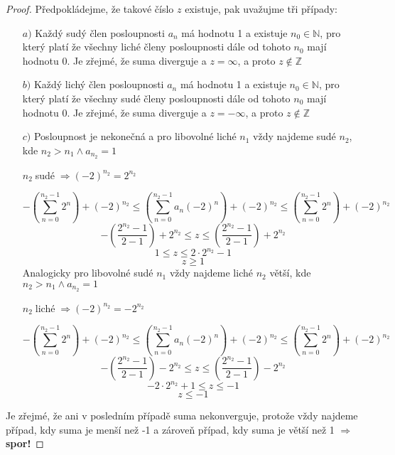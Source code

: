 \documentclass[czech,bachelor,dept470,male]{diploma}
\begin{document}
\begin{proof}
	Předpokládejme, že takové číslo $z$ existuje, pak uvažujme tři případy:
	\begin{itemize}
		\item[$a)$]
		Každý sudý člen posloupnosti $a_n$ má hodnotu 1 a existuje $n_0\in\mathbb{N}$, pro který platí že všechny liché členy posloupnosti dále od tohoto $n_0$ mají hodnotu 0.
		Je zřejmé, že suma diverguje a $z=\infty$, a proto $z \notin \mathbb{Z}$
		\item[$b)$]Každý lichý člen posloupnosti $a_n$ má hodnotu 1 a existuje $n_0\in\mathbb{N}$, pro který platí že všechny sudé členy posloupnosti dále od tohoto $n_0$ mají hodnotu 0.
		Je zřejmé, že suma diverguje a $z=-\infty$, a proto $z \notin \mathbb{Z}$
		\item[$c)$] Posloupnost je nekonečná a pro libovolné liché $n_1$ vždy najdeme sudé $n_2$, kde $ n_2>n_1 \land a_{n_2}=1$
		\begin{center}$ n_2 \; $sudé$ \; \Rightarrow (-2)^{n_2} = 2^{n_2}$\end{center}
		$$-\left(\sum_{n=0}^{n_2-1}2^n\right)+(-2)^{n_2}\leq \left(\sum_{n=0}^{n_2-1}a_n(-2)^n\right)+(-2)^{n_2}  \leq\left(\sum_{n=0}^{n_2-1}2^n\right)+(-2)^{n_2}$$
		$$-\left(\frac{2^{n_2}-1}{2-1}\right)+2^{n_2}\leq z \leq\left(\frac{2^{n_2}-1}{2-1} \right)+2^{n_2}$$
		$$1\leq z\leq 2\cdot2^{n_2}-1$$
		$$z\ge1$$
		Analogicky pro libovolné sudé $n_1$ vždy najdeme liché $n_2$ větší, kde $ n_2>n_1 \land a_{n_2}=1$
		\begin{center}$ n_2 \; $liché$ \; \Rightarrow (-2)^{n_2} = -2^{n_2}$\end{center}
		$$-\left(\sum_{n=0}^{n_2-1}2^n\right)+(-2)^{n_2}\leq \left(\sum_{n=0}^{n_2-1}a_n(-2)^n\right)+(-2)^{n_2}  \leq\left(\sum_{n=0}^{n_2-1}2^n\right)+(-2)^{n_2}$$
		$$-\left(\frac{2^{n_2}-1}{2-1}\right)-2^{n_2}\leq   z \leq\left(\frac{2^{n_2}-1}{2-1} \right)-2^{n_2}$$
		$$-2\cdot2^{n_2}+1\leq z\leq -1$$
		$$z\le-1$$
		
	\end{itemize}
	Je zřejmé, že ani v posledním případě suma nekonverguje, protože vždy najdeme případ, kdy suma je menší než -1 a zároveň případ, kdy suma je větší než 1 $\Rightarrow$ \textbf{spor!}
	
\end{proof}
\end{document}
